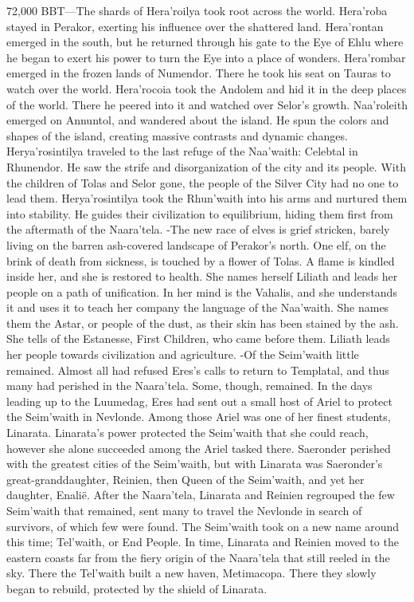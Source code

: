 \documentclass[smalldemyvopaper,11pt,twoside,onecolumn,openright,extrafontsizes]{memoir}
\begin{document}
{{72,000 BBT—The shards of Hera’roilya took root across the world. Hera’roba stayed in Perakor, exerting his influence over the shattered land. Hera’rontan emerged in the south, but he returned through his gate to the Eye of Ehlu where he began to exert his power to turn the Eye into a place of wonders. Hera’rombar emerged in the frozen lands of Numendor. There he took his seat on Tauras to watch over the world. Hera’rocoia took the Andolem and hid it in the deep places of the world. There he peered into it and watched over Selor’s growth. Naa’roleith emerged on Annuntol, and wandered about the island. He spun the colors and shapes of the island, creating massive contrasts and dynamic changes. Herya’rosintilya traveled to the last refuge of the Naa’waith: Celebtal in Rhunendor. He saw the strife and disorganization of the city and its people. With the children of Tolas and Selor gone, the people of the Silver City had no one to lead them. Herya’rosintilya took the Rhun’waith into his arms and nurtured them into stability. He guides their civilization to equilibrium, hiding them first from the aftermath of the Naara’tela.
-The new race of elves is grief stricken, barely living on the barren ash-covered landscape of Perakor’s north. One elf, on the brink of death from sickness, is touched by a flower of Tolas. A flame is kindled inside her, and she is restored to health. She names herself Liliath and leads her people on a path of unification. In her mind is the Vahalis, and she understands it and uses it to teach her company the language of the Naa’waith. She names them the Astar, or people of the dust, as their skin has been stained by the ash. She tells of the Estanesse, First Children, who came before them. Liliath leads her people towards civilization and agriculture.
-Of the Seim’waith little remained. Almost all had refused Eres’s calls to return to Templatal, and thus many had perished in the Naara’tela. Some, though, remained. In the days leading up to the Luumedag, Eres had sent out a small host of Ariel to protect the Seim’waith in Nevlonde. Among those Ariel was one of her finest students, Linarata. Linarata’s power protected the Seim’waith that she could reach, however she alone succeeded among the Ariel tasked there. Saeronder perished with the greatest cities of the Seim’waith, but with Linarata was Saeronder’s great-granddaughter, Reinien, then Queen of the Seim’waith, and yet her daughter, Enalië. After the Naara’tela, Linarata and Reinien regrouped the few Seim’waith that remained, sent many to travel the Nevlonde in search of survivors, of which few were found. The Seim’waith took on a new name around this time; Tel’waith, or End People. In time, Linarata and Reinien moved to the eastern coasts far from the fiery origin of the Naara’tela that still reeled in the sky. There the Tel’waith built a new haven, Metimacopa. There they slowly began to rebuild, protected by the shield of Linarata.

}}
\end{document}
